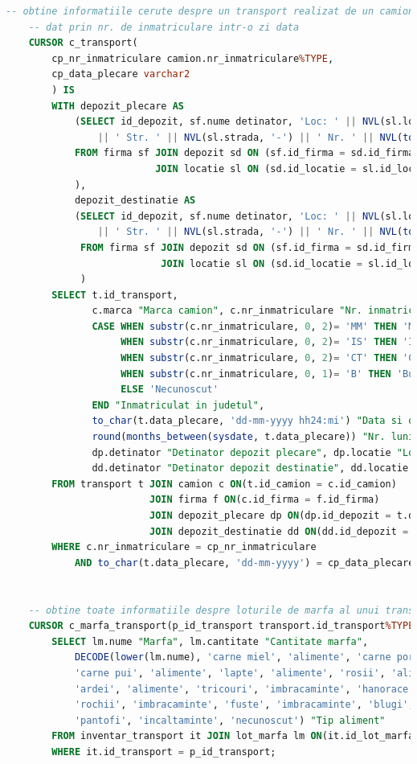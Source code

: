 \documentclass[12pt, a4paper]{article}
\begin{document}
\begin{lstlisting}[language=SQL]
    -- obtine informatiile cerute despre un transport realizat de un camion
    -- dat prin nr. de inmatriculare intr-o zi data
    CURSOR c_transport(
        cp_nr_inmatriculare camion.nr_inmatriculare%TYPE,
        cp_data_plecare varchar2
        ) IS
        WITH depozit_plecare AS
            (SELECT id_depozit, sf.nume detinator, 'Loc: ' || NVL(sl.localitate, '-')
                || ' Str. ' || NVL(sl.strada, '-') || ' Nr. ' || NVL(to_char(sl.nr), '-') locatie
            FROM firma sf JOIN depozit sd ON (sf.id_firma = sd.id_firma)
                          JOIN locatie sl ON (sd.id_locatie = sl.id_locatie)
            ),
            depozit_destinatie AS
            (SELECT id_depozit, sf.nume detinator, 'Loc: ' || NVL(sl.localitate, '-')
                || ' Str. ' || NVL(sl.strada, '-') || ' Nr. ' || NVL(to_char(sl.nr), '-') locatie
             FROM firma sf JOIN depozit sd ON (sf.id_firma = sd.id_firma)
                           JOIN locatie sl ON (sd.id_locatie = sl.id_locatie)
             )
        SELECT t.id_transport,
               c.marca "Marca camion", c.nr_inmatriculare "Nr. inmatriculare", 
               CASE WHEN substr(c.nr_inmatriculare, 0, 2)= 'MM' THEN 'Maramures'
                    WHEN substr(c.nr_inmatriculare, 0, 2)= 'IS' THEN 'Iasi'
                    WHEN substr(c.nr_inmatriculare, 0, 2)= 'CT' THEN 'Constanta'
                    WHEN substr(c.nr_inmatriculare, 0, 1)= 'B' THEN 'Bucuresti'
                    ELSE 'Necunoscut'
               END "Inmatriculat in judetul",
               to_char(t.data_plecare, 'dd-mm-yyyy hh24:mi') "Data si ora plecare",
               round(months_between(sysdate, t.data_plecare)) "Nr. luni de la transport",
               dp.detinator "Detinator depozit plecare", dp.locatie "Locatie depozit plecare", 
               dd.detinator "Detinator depozit destinatie", dd.locatie "Locatie depozit destinatie"
        FROM transport t JOIN camion c ON(t.id_camion = c.id_camion)
                         JOIN firma f ON(c.id_firma = f.id_firma)
                         JOIN depozit_plecare dp ON(dp.id_depozit = t.depozit_plecare) 
                         JOIN depozit_destinatie dd ON(dd.id_depozit = t.depozit_destinatie) 
        WHERE c.nr_inmatriculare = cp_nr_inmatriculare
            AND to_char(t.data_plecare, 'dd-mm-yyyy') = cp_data_plecare;
    
    
    -- obtine toate informatiile despre loturile de marfa al unui transport
    CURSOR c_marfa_transport(p_id_transport transport.id_transport%TYPE) IS 
        SELECT lm.nume "Marfa", lm.cantitate "Cantitate marfa",
            DECODE(lower(lm.nume), 'carne miel', 'alimente', 'carne porc', 'alimente',
            'carne pui', 'alimente', 'lapte', 'alimente', 'rosii', 'alimente',
            'ardei', 'alimente', 'tricouri', 'imbracaminte', 'hanorace', 'imbracaminte',
            'rochii', 'imbracaminte', 'fuste', 'imbracaminte', 'blugi', 'imbracaminte',
            'pantofi', 'incaltaminte', 'necunoscut') "Tip aliment"
        FROM inventar_transport it JOIN lot_marfa lm ON(it.id_lot_marfa = lm.id_lot_marfa)
        WHERE it.id_transport = p_id_transport; 
        

\end{lstlisting}
\end{document}
